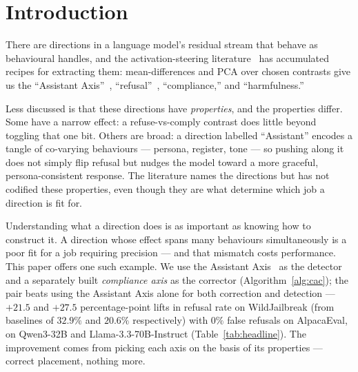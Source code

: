 \documentclass{article}
\begin{document}
\section{Introduction}
\label{sec:intro}

There are directions in a language model's residual stream that
behave as behavioural handles, and the activation-steering
literature~\cite{turner2023steering} has accumulated recipes for
extracting them: mean-differences and PCA over chosen contrasts give
us the ``Assistant Axis''~\cite{lu2026assistant},
``refusal''~\cite{arditi2024refusal}, ``compliance,'' and
``harmfulness.''

Less discussed is that these directions have \emph{properties}, and
the properties differ. Some have a narrow effect: a refuse-vs-comply
contrast does little beyond toggling that one bit. Others are broad:
a direction labelled ``Assistant'' encodes a tangle of co-varying
behaviours --- persona, register, tone --- so pushing along it does
not simply flip refusal but nudges the model toward a more graceful,
persona-consistent response. The literature names the directions but
has not codified these properties, even though they are what determine
which job a direction is fit for.

Understanding what a direction does is as important as knowing how to
construct it. A direction whose effect spans many behaviours
simultaneously is a poor fit for a job requiring precision --- and
that mismatch costs performance. This paper offers one such example. We use the Assistant
Axis~\cite{lu2026assistant} as the detector and a separately built
\emph{compliance axis} as the corrector
(Algorithm~\ref{alg:cac}); the pair beats using the Assistant
Axis alone for both correction and detection --- $+21.5$ and $+27.5$ percentage-point lifts in refusal rate on
WildJailbreak (from baselines of $32.9\%$ and $20.6\%$ respectively)
with $0\%$ false refusals on AlpacaEval, on Qwen3-32B and
Llama-3.3-70B-Instruct (Table~\ref{tab:headline}).
The improvement comes from picking each axis on the basis of its
properties --- correct placement, nothing more.
\end{document}
